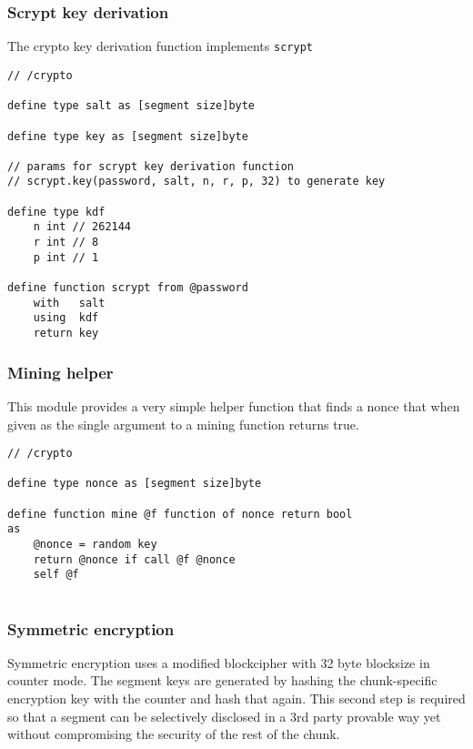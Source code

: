 \subsubsection{Scrypt key derivation}

The crypto key derivation function implements \lstinline{scrypt} 

\begin{definition}\label{def:scrypt}
\begin{lstlisting}[language=buzz1]
// /crypto

define type salt as [segment size]byte

define type key as [segment size]byte

// params for scrypt key derivation function
// scrypt.key(password, salt, n, r, p, 32) to generate key

define type kdf
    n int // 262144
    r int // 8
    p int // 1

define function scrypt from @password
    with   salt 
    using  kdf
    return key

\end{lstlisting}
\end{definition}  

\subsubsection{Mining helper}

This module provides a very simple helper function that finds a nonce that when given as the single argument to a mining function returns true.

\begin{definition}\label{def:mine}
\begin{lstlisting}[language=buzz1]
// /crypto

define type nonce as [segment size]byte

define function mine @f function of nonce return bool
as
    @nonce = random key
    return @nonce if call @f @nonce
    self @f
    
\end{lstlisting}
\end{definition}  

\subsubsection{Symmetric encryption}

Symmetric encryption uses a modified blockcipher with 32 byte blocksize in counter mode.
The segment keys are generated by hashing the chunk-specific encryption key with the counter and hash that again. This second step is required so that a segment can be selectively disclosed in a 3rd party provable way yet without compromising the security of the rest of the chunk.

